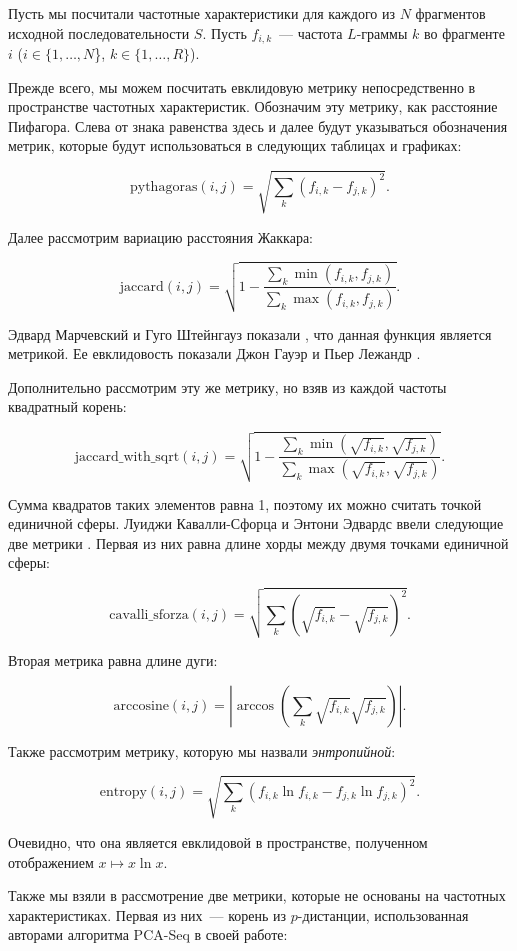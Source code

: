 Пусть мы посчитали частотные характеристики для каждого из $N$ фрагментов исходной последовательности $S$. Пусть $f_{i,k}$~--- частота $L$-граммы $k$ во фрагменте $i$ ($i \in \{1,\ldots, N$\}, $k \in \{1, \ldots, R\}$).

Прежде всего, мы можем посчитать евклидовую метрику непосредственно в пространстве частотных характеристик. Обозначим эту метрику, как расстояние Пифагора. Слева от знака равенства здесь и далее будут указываться обозначения метрик, которые будут использоваться в следующих таблицах и графиках:

$$\text{pythagoras}(i,j) = \sqrt{\sum_k \left(f_{i,k} - f_{j,k}\right)^2}.$$

Далее рассмотрим вариацию расстояния Жаккара:

$$\text{jaccard}(i, j) = \sqrt{1-\frac{\sum_k \min(f_{i,k}, f_{j,k})}{\sum_k \max(f_{i,k}, f_{j,k})}}.$$

Эдвард Марчевский и Гуго Штейнгауз показали \cite{Marczewski1958}, что данная функция является метрикой. Ее евклидовость показали Джон Гауэр и Пьер Лежандр \cite{Gower1986}.

Дополнительно рассмотрим эту же метрику, но взяв из каждой частоты квадратный корень:

$$\text{jaccard\_with\_sqrt}(i, j) = \sqrt{1-\frac{\sum_k \min(\sqrt{f_{i,k}}, \sqrt{f_{j,k}})}{\sum_k \max(\sqrt{f_{i,k}}, \sqrt{f_{j,k}})}}.$$

Сумма квадратов таких элементов равна 1, поэтому их можно считать точкой единичной сферы. Луиджи Кавалли-Сфорца и Энтони Эдвардс ввели следующие две метрики \cite{CavalliSforza1967}. Первая из них равна длине хорды между двумя точками единичной сферы:

$$\text{cavalli\_sforza}(i,j) = \sqrt{\sum_k \left(\sqrt{f_{i,k}} - \sqrt{f_{j,k}}\right)^2}.$$

Вторая метрика равна длине дуги:

$$\text{arccosine}(i,j) = \left|\arccos\left(\sum_k\sqrt{f_{i,k}}\sqrt{f_{j,k}}\right)\right|.$$

Также рассмотрим метрику, которую мы назвали \textit{энтропийной}:

$$\text{entropy}(i,j) = \sqrt{\sum_k \left(f_{i,k}\ln f_{i,k} - f_{j,k}\ln f_{j,k}\right)^2}.$$

Очевидно, что она является евклидовой в пространстве, полученном отображением $x \mapsto x\ln x$.

Также мы взяли в рассмотрение две метрики, которые не основаны на частотных характеристиках. Первая из них~--- корень из $p$-дистанции, использованная авторами алгоритма PCA-Seq в своей работе:

